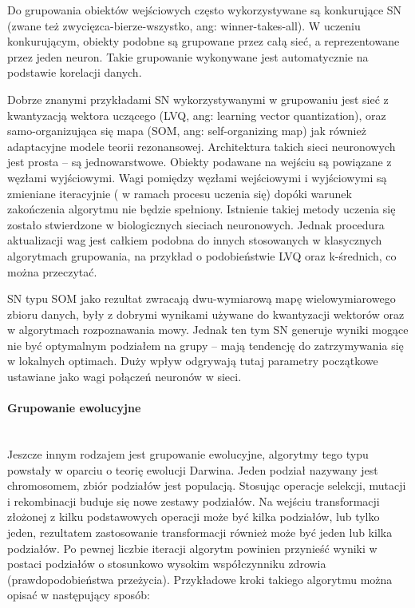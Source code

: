 \documentclass{article}
\newcommand{\myparagraph}[1]{\paragraph{#1}\mbox{}\\}
\begin{document}
Do grupowania obiektów wejściowych często wykorzystywane są konkurujące SN (zwane też zwycięzca-bierze-wszystko, ang: winner-takes-all). W uczeniu konkurującym, obiekty podobne są grupowane przez całą sieć, a reprezentowane przez jeden neuron. Takie grupowanie wykonywane jest automatycznie na podstawie korelacji danych. 

Dobrze znanymi przykładami SN wykorzystywanymi w grupowaniu jest sieć z kwantyzacją wektora uczącego (LVQ, ang: learning vector quantization), oraz samo-organizująca się mapa (SOM, ang: self-organizing map) jak również adaptacyjne modele teorii rezonansowej. Architektura takich sieci neuronowych jest prosta – są jednowarstwowe. Obiekty podawane na wejściu są powiązane z węzłami wyjściowymi. Wagi pomiędzy węzłami wejściowymi i wyjściowymi są zmieniane iteracyjnie ( w ramach procesu uczenia się) dopóki warunek zakończenia algorytmu nie będzie spełniony. Istnienie takiej metody uczenia się zostało stwierdzone w biologicznych sieciach neuronowych. Jednak procedura aktualizacji wag jest całkiem podobna do innych stosowanych w klasycznych algorytmach grupowania, na przykład o podobieństwie LVQ oraz k-średnich, co można przeczytać. 

SN typu SOM jako rezultat zwracają dwu-wymiarową mapę wielowymiarowego zbioru danych, były z dobrymi wynikami używane do kwantyzacji wektorów oraz w algorytmach rozpoznawania mowy. Jednak ten tym SN generuje wyniki mogące nie być optymalnym podziałem na grupy – mają tendencję do zatrzymywania się w lokalnych optimach. Duży wpływ odgrywają tutaj parametry początkowe ustawiane jako wagi połączeń neuronów w sieci.

\myparagraph{Grupowanie ewolucyjne}

Jeszcze innym rodzajem jest grupowanie ewolucyjne, algorytmy tego typu powstały w oparciu o teorię ewolucji Darwina. Jeden podział nazywany jest chromosomem, zbiór podziałów jest populacją. Stosując operacje selekcji, mutacji i rekombinacji buduje się nowe zestawy podziałów. Na wejściu transformacji złożonej z kilku podstawowych operacji może być kilka podziałów, lub tylko jeden,  rezultatem zastosowanie transformacji również może być jeden lub kilka podziałów. Po pewnej liczbie iteracji algorytm powinien przynieść wyniki w postaci podziałów o stosunkowo wysokim współczynniku zdrowia (prawdopodobieństwa przeżycia). Przykładowe kroki takiego algorytmu można opisać w następujący sposób: 
\end{document}
